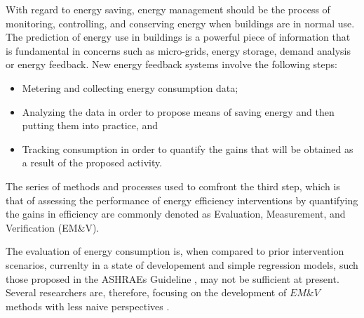 \documentclass[10pt, conference, compsocconf]{IEEEtran}
\begin{document}
With regard to energy saving, energy management should be the process of monitoring, controlling, and conserving energy when buildings are in normal use.  The prediction of energy use in buildings is a powerful piece of information that is fundamental in concerns such as micro-grids, energy storage, demand analysis or energy feedback. New energy feedback systems involve the following steps:

\begin{itemize}
\item Metering and collecting energy consumption data;
\item Analyzing the data in order to propose means of saving energy and then putting them into practice, and
\item Tracking consumption in order to quantify the gains that will be obtained as a result of the proposed activity.
\end{itemize}


The series of methods and processes used to comfront the third step, which is that of assessing the performance of energy efficiency interventions by quantifying the gains in efficiency are commonly denoted as Evaluation, Measurement, and Verification (EM\&V). 



The evaluation of energy consumption is, when compared to prior intervention scenarios, currenlty in a state of developement and  simple regression models, such those proposed in the ASHRAEs Guideline \cite{ashrae2002ashrae}, may not be sufficient at present. Several researchers are, therefore, focusing on the development of $EM\&V$  methods with less naive perspectives \cite{ramalloidentifying}. 
\end{document}
